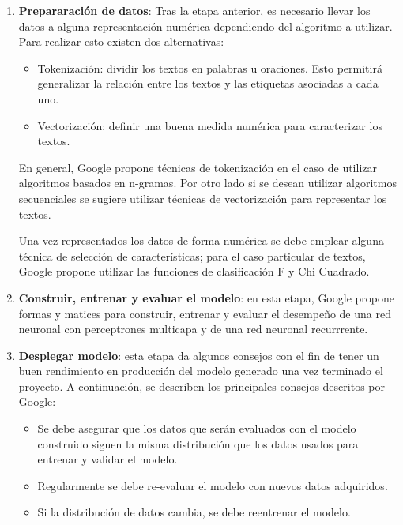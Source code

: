 \begin{enumerate}
    \item \textbf{Prepararación de datos}: Tras la etapa anterior, es necesario llevar los datos a alguna representación numérica dependiendo del algoritmo a utilizar. Para realizar esto existen dos alternativas:
    \begin{itemize}
        \item Tokenización: dividir los textos en palabras u oraciones. Esto permitirá generalizar la relación entre los textos y las etiquetas asociadas a cada uno. 
        \item Vectorización: definir una buena medida numérica para caracterizar los textos.
    \end{itemize}
        En general, Google propone técnicas de tokenización en el caso de utilizar algoritmos basados en n-gramas. Por otro lado si se desean utilizar algoritmos secuenciales se sugiere utilizar técnicas de vectorización para representar los textos. 
        
        Una vez representados los datos de forma numérica se debe emplear alguna técnica de selección de características; para el caso particular de textos, Google propone utilizar las funciones de clasificación F y Chi Cuadrado.
    \item \textbf{Construir, entrenar y evaluar el modelo}: en esta etapa, Google propone formas y matices para construir, entrenar y evaluar el desempeño de una red neuronal con perceptrones multicapa y de una red neuronal recurrrente. 
    \item \textbf{Desplegar modelo}: esta etapa da algunos consejos con el fin de tener un buen rendimiento en producción del modelo generado una vez terminado el proyecto. A continuación, se describen los principales consejos descritos por Google:
    \begin{itemize}
        \item Se debe asegurar que los datos que serán evaluados con el modelo construido siguen la misma distribución que los datos usados para entrenar y validar el modelo.
        \item Regularmente se debe re-evaluar el modelo con nuevos datos adquiridos.
        \item Si la distribución de datos cambia, se debe reentrenar el modelo.
    \end{itemize}
    \end{enumerate}
    
